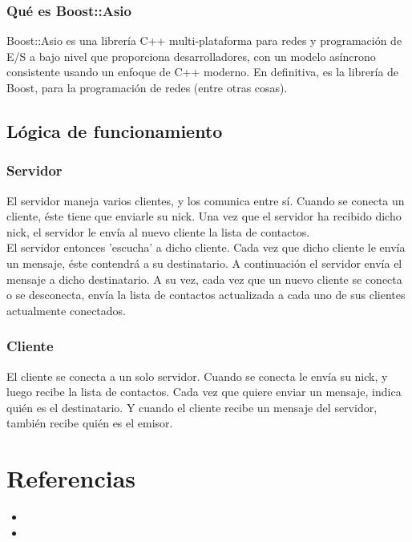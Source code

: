 \documentclass[a4paper,11pt,titlepage,halfparskip,cleardoubleempty]{scrbook}
\begin{document}
\subsection{Qué es Boost::Asio}

Boost::Asio es una librería C++ multi-plataforma para redes y programación de E/S a bajo nivel que proporciona desarrolladores, con un modelo asíncrono consistente usando un enfoque de C++ moderno. En definitiva, es la librería de Boost, para la programación de redes (entre otras cosas).

\section{Lógica de funcionamiento}
\subsection{Servidor}
  El servidor maneja varios clientes, y los comunica entre sí. Cuando se conecta   un cliente, éste tiene que enviarle su nick. Una vez que el servidor ha recibido   dicho nick, el servidor le envía al nuevo cliente la lista de contactos.\\

  El servidor entonces 'escucha' a dicho cliente. Cada vez que dicho cliente le envía un  mensaje, éste contendrá a su destinatario. A continuación el servidor envía el mensaje a dicho  destinatario. A su vez, cada vez que un nuevo cliente se conecta o se desconecta, envía  la lista de contactos actualizada a cada uno de sus clientes actualmente conectados.\\

\subsection{Cliente}
  El cliente se conecta a un solo servidor. Cuando se conecta le envía su nick, y luego recibe la lista de contactos. Cada vez que quiere enviar un mensaje, indica quién es el destinatario. Y cuando el cliente recibe un mensaje del servidor, también recibe  quién es el emisor.



\chapter{Referencias}
\begin{itemize}
\item {}
\item {}

\end{itemize}
\end{document}
